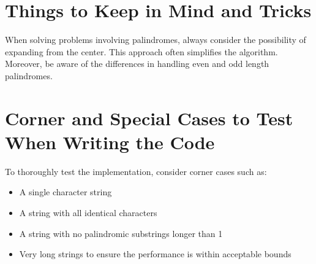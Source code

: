 \section*{Things to Keep in Mind and Tricks}

When solving problems involving palindromes, always consider the possibility of expanding from the center. This approach often simplifies the algorithm. Moreover, be aware of the differences in handling even and odd length palindromes. 

\section*{Corner and Special Cases to Test When Writing the Code}

To thoroughly test the implementation, consider corner cases such as:
\begin{itemize}
    \item A single character string
    \item A string with all identical characters
    \item A string with no palindromic substrings longer than 1
    \item Very long strings to ensure the performance is within acceptable bounds
\end{itemize}

\printindex